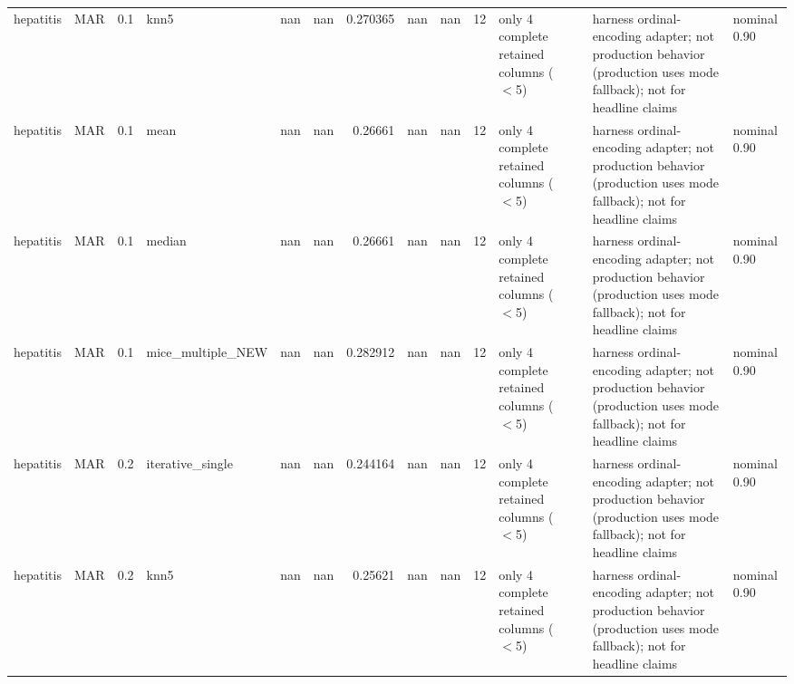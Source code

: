 \begin{table}[ht]
\begin{tabular}{llrlrrrrrrllll}
 hepatitis & MAR         &         0.1 & knn5              &     nan        &           nan        &                 0.270365 &                   nan          &                       nan        &        12 & only 4 complete retained columns (\ensuremath{<}5) &                                                                       & harness ordinal-encoding adapter; not production behavior (production uses mode fallback); not for headline claims & nominal 0.90              \\
 hepatitis & MAR         &         0.1 & mean              &     nan        &           nan        &                 0.26661  &                   nan          &                       nan        &        12 & only 4 complete retained columns (\ensuremath{<}5) &                                                                       & harness ordinal-encoding adapter; not production behavior (production uses mode fallback); not for headline claims & nominal 0.90              \\
 hepatitis & MAR         &         0.1 & median            &     nan        &           nan        &                 0.26661  &                   nan          &                       nan        &        12 & only 4 complete retained columns (\ensuremath{<}5) &                                                                       & harness ordinal-encoding adapter; not production behavior (production uses mode fallback); not for headline claims & nominal 0.90              \\
 hepatitis & MAR         &         0.1 & mice\_multiple\_NEW &     nan        &           nan        &                 0.282912 &                   nan          &                       nan        &        12 & only 4 complete retained columns (\ensuremath{<}5) &                                                                       & harness ordinal-encoding adapter; not production behavior (production uses mode fallback); not for headline claims & nominal 0.90              \\
 hepatitis & MAR         &         0.2 & iterative\_single  &     nan        &           nan        &                 0.244164 &                   nan          &                       nan        &        12 & only 4 complete retained columns (\ensuremath{<}5) &                                                                       & harness ordinal-encoding adapter; not production behavior (production uses mode fallback); not for headline claims & nominal 0.90              \\
 hepatitis & MAR         &         0.2 & knn5              &     nan        &           nan        &                 0.25621  &                   nan          &                       nan        &        12 & only 4 complete retained columns (\ensuremath{<}5) &                                                                       & harness ordinal-encoding adapter; not production behavior (production uses mode fallback); not for headline claims & nominal 0.90              \\

\end{tabular}
\end{table}
